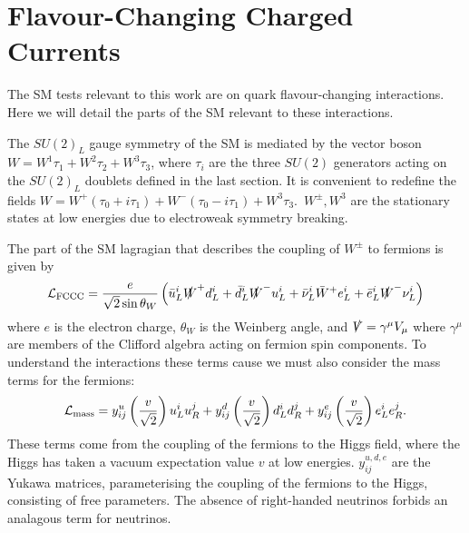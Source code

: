 \section{Flavour-Changing Charged Currents}

The SM tests relevant to this work are on quark flavour-changing interactions. Here we will detail the parts of the SM relevant to these interactions. 

The $SU(2)_L$ gauge symmetry of the SM is mediated by the vector boson $W=W^1\tau_1 + W^2\tau_2 + W^3\tau_3$, where $\tau_i$ are the three $SU(2)$ generators acting on the $SU(2)_L$ doublets defined in the last section. It is convenient to redefine the fields $W = W^+ ( \tau_0 + i\tau_1 ) + W^- ( \tau_0 - i\tau_1 ) + W^3 \tau_3$.\, $W^{\pm},W^3$ are the stationary states at low energies due to electroweak symmetry breaking. 

The part of the SM lagragian that describes the coupling of $W^{\pm}$ to fermions is given by
\begin{align}
  \mathcal{L}_{\text{FCCC}} = {e\over \sqrt{2}\sin\theta_W} \left( \bar{u}_L^i \slashed{W}^+ d_L^i + \bar{d}_L^i \slashed{W}^- u_L^i + \bar{\nu}_L^i \bar{W}^+ e_L^i + \bar{e}_L^i \slashed{W}^- \nu_L^i \right)
  \label{eq:FCCC}
\end{align}
where $e$ is the electron charge, $\theta_W$ is the Weinberg angle, and $\slashed{V} = \gamma^{\mu} V_{\mu}$ where $\gamma^{\mu}$ are members of the Clifford algebra acting on fermion spin components. To understand the interactions these terms cause we must also consider the mass terms for the fermions:
\begin{align}
  \mathcal{L}_{\text{mass}} = y_{ij}^u \left({v\over \sqrt{2}}\right) u_L^i u_R^j + y_{ij}^d \left({v\over \sqrt{2}}\right) d_L^i d_R^j + y_{ij}^e \left({v\over \sqrt{2}}\right) e_L^i e_R^j.
\end{align}
These terms come from the coupling of the fermions to the Higgs field, where the Higgs has taken a vacuum expectation value $v$ at low energies. $y^{u,d,e}_{ij}$ are the Yukawa matrices, parameterising the coupling of the fermions to the Higgs, consisting of free parameters. The absence of right-handed neutrinos forbids an analagous term for neutrinos.

